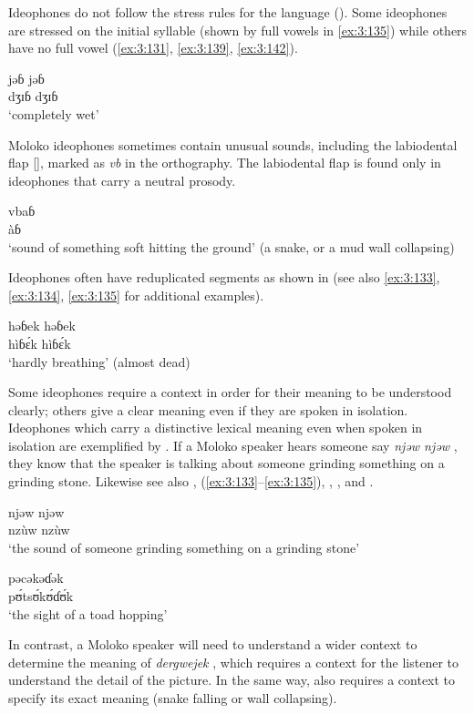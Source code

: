 Ideophones do not follow the stress rules for the language (). Some ideophones are stressed on the initial syllable (shown by full vowels in \ref{ex:3:135}) while others have no full vowel (\ref{ex:3:131}, \ref{ex:3:139}, \ref{ex:3:142}). 

\ea \label{ex:3:139}
\gll jəɓ  jəɓ\\
  dʒɪɓ dʒɪɓ\\
\glt  ‘completely wet’
\z

Moloko ideophones sometimes contain unusual sounds, including the labiodental flap [\dentalflap ], marked as \textit{vb} in the orthography. The labiodental flap is found only in ideophones that carry a neutral prosody. 

\ea \label{ex:3:140}
\gll vbaɓ\\
  \dentalflap àɓ\\
\glt  ‘sound of something soft hitting the ground’ (a snake, or a mud wall collapsing)
\z

Ideophones often have reduplicated segments as shown in  (see also \ref{ex:3:133}, \ref{ex:3:134}, \ref{ex:3:135} for additional examples).

\ea \label{ex:3:141}
\gll həɓek  həɓek\\
  hìɓ\'{ɛ}k   hìɓ\'{ɛ}k\\
\glt  ‘hardly breathing’ (almost dead)
\z

Some ideophones require a context in order for their meaning to be understood clearly; others give a clear meaning even if they are spoken in isolation. Ideophones which carry a distinctive lexical meaning even when spoken in isolation are exemplified by . If a Moloko speaker hears someone say \textit{njəw njəw} , they know that the speaker is talking about someone grinding something on a grinding stone. Likewise see also , (\ref{ex:3:133}--\ref{ex:3:135}), , , and . 

\ea \label{ex:3:142}
\gll njəw  njəw\\
  nzùw  nzùw\\
\glt  ‘the sound of someone grinding something on a grinding stone’
\z

\ea \label{ex:3:143}
\gll pəcəkəɗək\\
  p\'{ʊ}ts\'{ʊ}k\'{ʊ}ɗ\'{ʊ}k\\
\glt  ‘the sight of a toad hopping’
\z

In contrast, a Moloko speaker will need to understand a wider context to determine the meaning of \textit{dergwejek} , which requires a context for the listener to understand the detail of the picture. In the same way,  also requires a context to specify its exact meaning (snake falling or wall collapsing).

